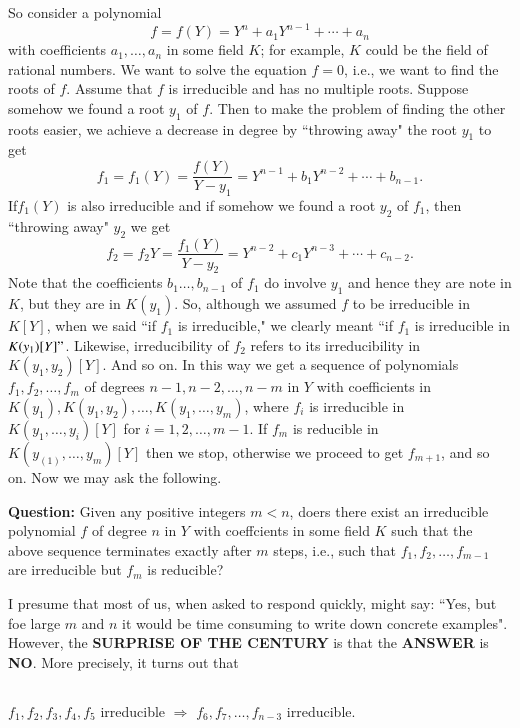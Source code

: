 So consider a polynomial
$$
f=f(Y) = Y^{n}+a_{1}Y^{n-1}+\cdots+a_{n}
$$
with coefficients $a_{1}, \ldots,a_{n}$ in some field $K$; for example, $K$ could be the field of rational numbers. We want to solve the equation $f=0$, i.e., we want to find the roots of $f$. Assume that $f$ is irreducible and has no multiple roots. Suppose somehow we found a root $y_{1} $ of $f$. Then to make the problem of finding the other roots easier, we achieve a decrease in degree by ``throwing away" the root $y_{1}$ to get
$$
f_{1}=f_{1}(Y)=\dfrac{f(Y)}{Y-y_{1}}=Y^{n-1}+b_{1}Y^{n-2}+\cdots+b_{n-1}.
$$
If\pageoriginale $f_{1}(Y)$ is also irreducible and if somehow we found a root $y_{2}$ of $f_{1}$, then  ``throwing away" $y_{2}$ we get
$$
f_{2} = f_{2}Y = \dfrac{f_{1}(Y)}{Y-y_{2}}=Y^{n-2}+c_{1}Y^{n-3}+\cdots+c_{n-2}.
$$
Note that the coefficients $b_{1}\ldots, b_{n-1}$ of $f_{1}$ do involve $y_{1}$ and hence they are note in $K$, but they are in $K(y_{1})$. So, although we assumed $f$ to be irreducible in $K[Y]$, when we said ``if  $f_{1}$ is irreducible," we clearly meant ``if $f_{1}$ is irreducible in $K(y_{1})[Y]"$. Likewise, irreducibility of $f_{2}$ refers to its irreducibility in $K(y_{1}, y_{2})[Y]$. And so on. In this way we get a sequence of polynomials $f_{1}, f_{2}, \ldots, f_{m}$ of degrees $n-1, n-2, \ldots, n-m$ in $Y$ with coefficients in $K(y_1), K(y_{1}, y_{2}), \ldots, K(y_{1},\ldots,y_{m})$, where $f_{i}$ is irreducible in $K(y_{1}, \ldots, y_{i})[Y]$ for $i=1, 2, \ldots, m-1$. If $f_{m}$ is reducible in $K(y_(1), \ldots, y_{m})[Y]$ then we stop, otherwise we proceed to get $f_{m+1}$, and so on. Now we may ask the following. 

\medskip
\noindent
{\bf Question:} Given any positive integers $m<n$, doers there exist an irreducible polynomial $f$ of degree $n$ in $Y$ with coeffcients in some field $K$ such that the above sequence terminates exactly after $m$ steps, i.e., such that  $f_{1}, f_{2}, \ldots, f_{m-1}$ are irreducible but $f_{m}$ is reducible?  

I presume that most of us, when asked to respond quickly, might say: ``Yes, but foe large $m$ and $n$ it would be time consuming to write down concrete examples". However, the {\bf SURPRISE OF THE CENTURY}  is that the {\bf ANSWER} is {\bf NO}. More precisely, it turns out that

\subsection{}\label{chap1-sec2.1} 
$f_{1}, f_{2}, f_{3}, f_{4}, f_{5}$ irreducible $\Rightarrow$ $f_{6}, f_{7},\ldots, f_{n-3}$ irreducible.

